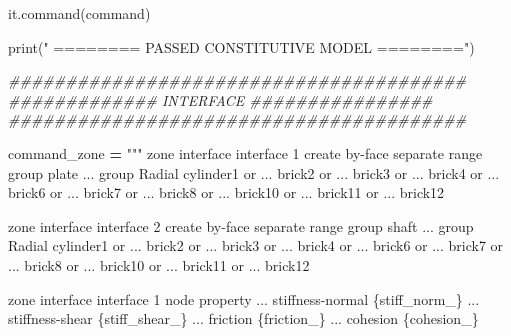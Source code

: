 \documentclass[a4paper, nobind]{templates/ociamthesis}
\newenvironment{Shaded}{\begin{snugshade}}{\end{snugshade}}
\newcommand{\BuiltInTok}[1]{#1}
\newcommand{\CommentTok}[1]{\textcolor[rgb]{0.56,0.35,0.01}{\textit{#1}}}
\newcommand{\NormalTok}[1]{#1}
\newcommand{\OperatorTok}[1]{\textcolor[rgb]{0.81,0.36,0.00}{\textbf{#1}}}
\newcommand{\SpecialCharTok}[1]{\textcolor[rgb]{0.00,0.00,0.00}{#1}}
\newcommand{\StringTok}[1]{\textcolor[rgb]{0.31,0.60,0.02}{#1}}
\renewenvironment{Shaded}
{
  \vspace{10pt}%
  \begin{snugshade}%
}{%
  \end{snugshade}%
  \vspace{8pt}%
}
\begin{document}
\begin{Shaded}
\begin{Highlighting}[]
\NormalTok{it.command(command)}

\BuiltInTok{print}\NormalTok{(}\StringTok{"               ======== PASSED CONSTITUTIVE MODEL ========"}\NormalTok{)}

\CommentTok{\#\#\#\#\#\#\#\#\#\#\#\#\#\#\#\#\#\#\#\#\#\#\#\#\#\#\#\#\#\#\#\#\#\#\#\#\#\#\#\#}
\CommentTok{\#\#\#\#\#\#\#\#\#\#\#\#\# INTERFACE \#\#\#\#\#\#\#\#\#\#\#\#\#\#\#\#}
\CommentTok{\#\#\#\#\#\#\#\#\#\#\#\#\#\#\#\#\#\#\#\#\#\#\#\#\#\#\#\#\#\#\#\#\#\#\#\#\#\#\#\#}

\NormalTok{command\_zone }\OperatorTok{=} \StringTok{"""}
\StringTok{zone interface \textquotesingle{}interface 1\textquotesingle{} create by{-}face separate range group \textquotesingle{}plate\textquotesingle{} ...}
\StringTok{group \textquotesingle{}Radial cylinder1\textquotesingle{} or ...}
\StringTok{\textquotesingle{}brick2\textquotesingle{} or ...}
\StringTok{\textquotesingle{}brick3\textquotesingle{} or ...}
\StringTok{\textquotesingle{}brick4\textquotesingle{} or ...}
\StringTok{\textquotesingle{}brick6\textquotesingle{} or ...}
\StringTok{\textquotesingle{}brick7\textquotesingle{} or ...}
\StringTok{\textquotesingle{}brick8\textquotesingle{} or ...}
\StringTok{\textquotesingle{}brick10\textquotesingle{} or ...}
\StringTok{\textquotesingle{}brick11\textquotesingle{} or ...}
\StringTok{\textquotesingle{}brick12\textquotesingle{}}

\StringTok{zone interface \textquotesingle{}interface 2\textquotesingle{} create by{-}face separate range group \textquotesingle{}shaft\textquotesingle{} ...}
\StringTok{group \textquotesingle{}Radial cylinder1\textquotesingle{} or ...}
\StringTok{\textquotesingle{}brick2\textquotesingle{} or ...}
\StringTok{\textquotesingle{}brick3\textquotesingle{} or ...}
\StringTok{\textquotesingle{}brick4\textquotesingle{} or ...}
\StringTok{\textquotesingle{}brick6\textquotesingle{} or ...}
\StringTok{\textquotesingle{}brick7\textquotesingle{} or ...}
\StringTok{\textquotesingle{}brick8\textquotesingle{} or ...}
\StringTok{\textquotesingle{}brick10\textquotesingle{} or ...}
\StringTok{\textquotesingle{}brick11\textquotesingle{} or ...}
\StringTok{\textquotesingle{}brick12\textquotesingle{}}

\StringTok{zone interface \textquotesingle{}interface 1\textquotesingle{} node property ...}
\StringTok{stiffness{-}normal }\SpecialCharTok{\{stiff\_norm\_\}}\StringTok{ ...}
\StringTok{stiffness{-}shear }\SpecialCharTok{\{stiff\_shear\_\}}\StringTok{ ...}
\StringTok{friction }\SpecialCharTok{\{friction\_\}}\StringTok{ ...}
\StringTok{cohesion }\SpecialCharTok{\{cohesion\_\}}


\end{Highlighting}
\end{Shaded}
\end{document}
